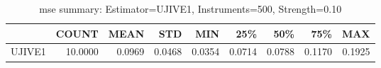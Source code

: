 \begin{table}[ht]
\centering
\caption{mse summary: Estimator=UJIVE1, Instruments=500, Strength=0.10}
\begin{tabular}{lrrrrrrrr}
\toprule
 & COUNT & MEAN & STD & MIN & 25\% & 50\% & 75\% & MAX \\
\midrule
UJIVE1 & 10.0000 & 0.0969 & 0.0468 & 0.0354 & 0.0714 & 0.0788 & 0.1170 & 0.1925 \\
\bottomrule
\end{tabular}
\end{table}
